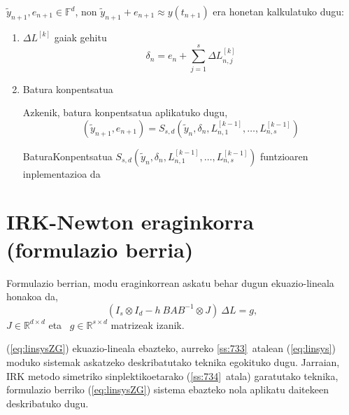 $\tilde{y}_{n+1}, e_{n+1} \in \mathbb{F}^d$, non $\tilde{y}_{n+1}+e_{n+1}\approx y(t_{n+1})$ era honetan kalkulatuko dugu:
\begin{enumerate}

\item $\Delta L^{[k]}$ gaiak gehitu
\begin{equation*}
\delta_{n}={e}_{n} + \sum\limits_{j=1}^{s}\Delta L_{n,j}^{[k]}
\end{equation*}

\item Batura konpentsatua

Azkenik, batura konpentsatua aplikatuko dugu,
\begin{equation}
\label{eq:bkLi2}
(\tilde y_{n+1}, e_{n+1}) = S_{s,d}(\tilde y_n, \delta_n, L_{n,1}^{[k-1]}, \dots,L_{n,s}^{[k-1]})
\end{equation}
 
\begin{algorithm}[H]
  \SetAlgoLined\DontPrintSemicolon
  \caption{BaturaKonpentsatua $S_{s,d}(\tilde y_n, \delta_n, L_{n,1}^{[k-1]}, \dots,L_{n,s}^{[k-1]})$ funtzioaren inplementazioa da}
\end{algorithm} 

\end{enumerate}

\section{IRK-Newton eraginkorra (formulazio berria)}
\label{sec:7.5}

Formulazio berrian, modu eraginkorrean askatu behar dugun ekuazio-lineala honakoa da, 
\begin{equation}
\label{eq:linsysZG}
(I_s \otimes I_d - h \ BAB^{-1} \otimes J) \ \Delta L = g, 
\end{equation}
$J \in \mathbb{R}^{d \times d}$  eta ~$g \in \mathbb{R}^{s \times d}$ matrizeak izanik. 

(\ref{eq:linsysZG}) ekuazio-lineala  ebazteko, aurreko  \ref{ss:733}~atalean (\ref{eq:linsys}) moduko sistemak askatzeko deskribatutako teknika egokituko dugu. Jarraian, IRK metodo simetriko sinplektikoetarako (\ref{ss:734}~atala) garatutako teknika, formulazio berriko (\ref{eq:linsysZG}) sistema ebazteko nola aplikatu daitekeen deskribatuko dugu.

